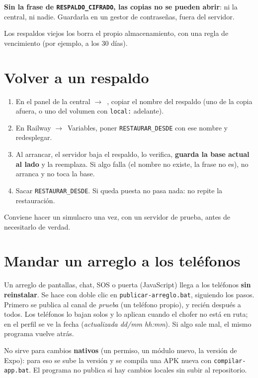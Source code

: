 \documentclass[11pt,a4paper,oneside]{book}
\newcommand{\boton}[1]{\tcbox[on line,boxsep=0pt,left=3pt,right=3pt,top=1.5pt,bottom=1.5pt,
  colback=white,colframe=linea,boxrule=0.5pt,arc=2pt]{\footnotesize\bfseries\color{tinta2}#1}}
\newcommand{\flecha}{$\rightarrow$\ }
\begin{document}
\begin{importante}
\textbf{Sin la frase de \texttt{RESPALDO\_CIFRADO}, las copias no se pueden
abrir}: ni la central, ni nadie. Guardarla en un gestor de contraseñas, fuera
del servidor.
\end{importante}

Los respaldos viejos los borra el propio almacenamiento, con una regla de
vencimiento (por ejemplo, a los 30 días).

\section{Volver a un respaldo}

\begin{enumerate}
  \item En el panel de la central \flecha \boton{RESPALDOS}, copiar el nombre
    del respaldo (uno de la copia afuera, o uno del volumen con
    \texttt{local:} adelante).
  \item En Railway \flecha Variables, poner \texttt{RESTAURAR\_DESDE} con ese
    nombre y redesplegar.
  \item Al arrancar, el servidor baja el respaldo, lo verifica,
    \textbf{guarda la base actual al lado} y la reemplaza. Si algo falla (el
    nombre no existe, la frase no es), no arranca y no toca la base.
  \item Sacar \texttt{RESTAURAR\_DESDE}. Si queda puesta no pasa nada: no repite
    la restauración.
\end{enumerate}

Conviene hacer un simulacro una vez, con un servidor de prueba, antes de
necesitarlo de verdad.

\section{Mandar un arreglo a los teléfonos}

Un arreglo de pantallas, chat, SOS o puerta (JavaScript) llega a los
teléfonos \textbf{sin reinstalar}. Se hace con doble clic en
\texttt{publicar-arreglo.bat}, siguiendo los pasos. Primero se publica al canal de \emph{prueba} (un
teléfono propio), y recién después a todos. Los teléfonos lo bajan solos y lo
aplican cuando el chofer no está en ruta; en el perfil se ve la fecha
(\emph{actualizada dd/mm hh:mm}). Si algo sale mal, el mismo programa vuelve
atrás.

No sirve para cambios \textbf{nativos} (un permiso, un módulo nuevo, la
versión de Expo): para eso se sube la versión y se compila una APK nueva con
\texttt{compilar-app.bat}. El programa no publica si hay cambios locales sin
subir al repositorio.
\end{document}
